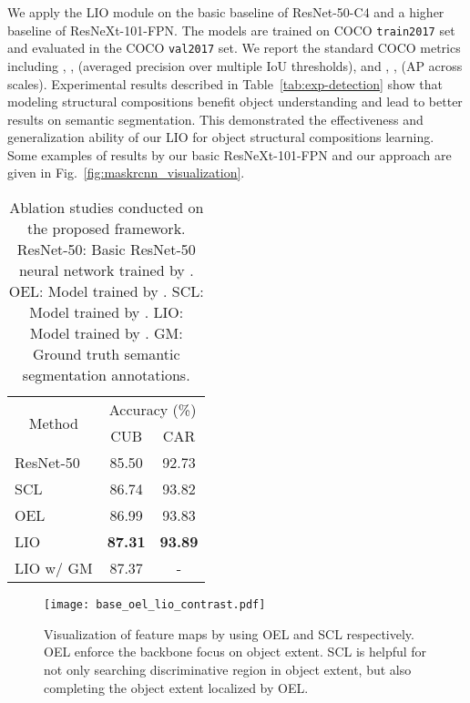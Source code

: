 \documentclass[10pt,twocolumn,letterpaper]{article}
\begin{document}
We apply the LIO module on the basic baseline of ResNet-50-C4 and a higher baseline of ResNeXt-101-FPN. The models are trained on COCO {\tt train2017} set and evaluated in the COCO {\tt val2017} set. We report the standard COCO metrics including , ,  (averaged precision over multiple IoU thresholds), and , ,  (AP across scales). Experimental results described in Table~\ref{tab:exp-detection} show that modeling structural compositions benefit object understanding and lead to better results on semantic segmentation. 
This demonstrated the effectiveness and generalization ability of our LIO for object structural compositions learning. Some examples of results by our basic ResNeXt-101-FPN and our approach are given in Fig.~\ref{fig:maskrcnn_visualization}.

\begin{table}[!ht]
\small
\begin{center}
    \begin{tabular}{|l|cc|}
    \hline
    \multicolumn{1}{|c|}{\multirow{2}{*}{Method}}  & \multicolumn{2}{c|}{Accuracy (\%)}  \\ \cline{2-3} 
    \multicolumn{1}{|c|}{} & CUB & CAR \\ \hline\hline
    ResNet-50~\cite{resnet} &  85.50  &  92.73      \\
    SCL          &  86.74  &  93.82 \\
    OEL         &  86.99  & 93.83 \\
    LIO          &  \textbf{87.31}  &  \textbf{93.89} \\ \hline\hline
    LIO w/ GM   &   87.37 & - \\
    \hline
\end{tabular}
\end{center}
    \caption{Ablation studies conducted on the proposed framework. ResNet-50: Basic ResNet-50 neural network trained by . OEL: Model trained by . SCL: Model trained by . LIO: Model trained by . GM: Ground truth semantic segmentation annotations.}
    \label{tab:exp-ablation}
\end{table}
\begin{figure}[!t]
    \centering
    \texttt{[image: base\_oel\_lio\_contrast.pdf]}
    \caption{Visualization of feature maps by using OEL and SCL respectively. OEL enforce the backbone focus on object extent. SCL is helpful for not only searching discriminative region in object extent, but also completing the object extent localized by OEL.} 
    \label{fig:scl_effect}
\end{figure}
\end{document}
